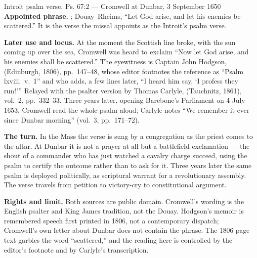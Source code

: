\begin{afterlife}{Introit psalm verse, Ps. 67:2 --- Cromwell at Dunbar, 3 September 1650}
\textbf{Appointed phrase.} ;
Douay--Rheims, ``Let God arise, and let his enemies be scattered.'' It is the
verse the missal appoints as the Introit's psalm verse.

\textbf{Later use and locus.} At the moment the Scottish line broke, with the
sun coming up over the sea, Cromwell was heard to exclaim ``Now let God arise,
and his enemies shall be scattered.'' The eyewitness is Captain John Hodgson,
 (Edinburgh, 1806), pp.~147--48, whose editor footnotes the reference
as ``Psalm lxviii.\ v.~1'' and who adds, a few lines later, ``I heard him say,
`I profess they run!''' Relayed with the psalter version by Thomas Carlyle,
\work{Oliver Cromwell's Letters and Speeches} (Tauchnitz, 1861), vol.~2,
pp.~332--33. Three years later, opening Barebone's Parliament on 4 July 1653,
Cromwell read the whole psalm aloud; Carlyle notes ``We remember it ever since
Dunbar morning'' (vol.~3, pp.~171--72).

\textbf{The turn.} In the Mass the verse is sung by a congregation as the
priest comes to the altar. At Dunbar it is not a prayer at all but a
battlefield exclamation --- the shout of a commander who has just watched a
cavalry charge succeed, using the psalm to certify the outcome rather than to
ask for it. Three years later the same psalm is deployed politically, as
scriptural warrant for a revolutionary assembly. The verse travels from
petition to victory-cry to constitutional argument.

\textbf{Rights and limit.} Both sources are public domain. Cromwell's wording is
the English psalter and King James tradition, not the Douay. Hodgson's memoir is
remembered speech first printed in 1806, not a contemporary dispatch; Cromwell's
own letter about Dunbar does not contain the phrase. The 1806 page text garbles
the word ``scattered,'' and the reading here is controlled by the editor's
footnote and by Carlyle's transcription.
\end{afterlife}

